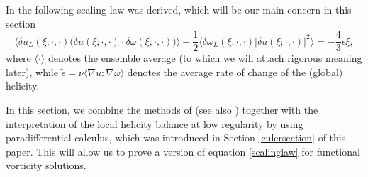 \documentclass[12pt,a4paper]{article}
\theoremstyle{definition}
\theoremstyle{remark}
\numberwithin{equation}{section}
\begin{document}
In \cite{gomez} the following scaling law was derived, which will be our main concern in this section
\begin{equation} \label{scalinglaw}
\big\langle \delta u_L (\xi;\cdot,\cdot) \big( \delta u (\xi;\cdot,\cdot) \cdot \delta \omega (\xi;\cdot,\cdot) \big) \rangle - \frac{1}{2} \langle \delta \omega_L (\xi;\cdot,\cdot) \lvert \delta u(\xi;\cdot,\cdot) \rvert^2 \rangle = - \frac{4}{3} \tilde{\epsilon} \xi,
\end{equation}
where $\langle \cdot \rangle$ denotes the ensemble average (to which we will attach rigorous meaning later), while $\tilde{\epsilon} = \nu \big\langle \nabla u : \nabla \omega \rangle$ denotes the average rate of change of the (global) helicity. 

In this section, we combine the methods of \cite{duchon,eyinklocal} (see also \cite{nie,novackscaling}) together with the interpretation of the local helicity balance at low regularity by using paradifferential calculus, which was introduced in Section \ref{eulersection} of this paper. This will allow us to prove a version of equation \eqref{scalinglaw} for functional vorticity solutions.
\end{document}

